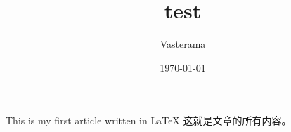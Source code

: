 \documentclass[UTF8]{ctexart}
\title{test}
\author{Vastera\li  ma}
\date{\today}
\begin{document}
 
    \maketitle
    
    This is my first article written in LaTeX
    这就是文章的所有内容。
    ​
    
\end{document}
